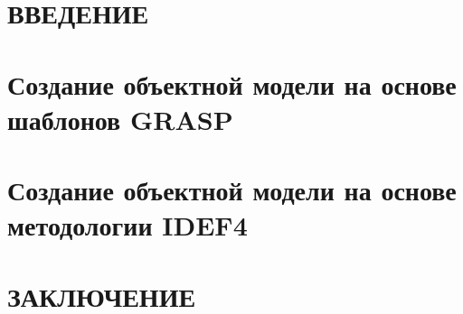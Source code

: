 \documentclass[
    a4paper,
    14pt,
    twoside,
]{extarticle}
\begin{document}

\setcounter{page}{2}

\tableofcontents

\newpage
\section*{\MakeUppercase{Введение}}\label{sec:introduction}



\newpage
\section{Создание объектной модели на основе шаблонов GRASP}



\newpage
\section{Создание объектной модели на основе методологии IDEF4}


\newpage
\section*{\MakeUppercase{Заключение}}\label{sec:conclusion}

\end{document}
